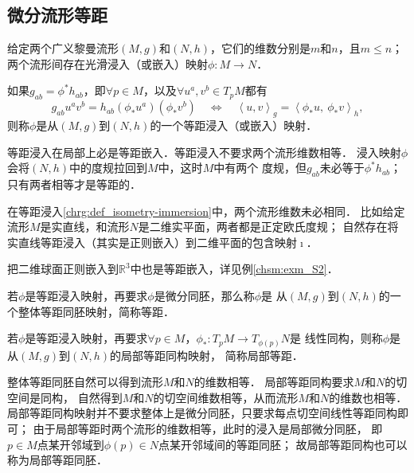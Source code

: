 \subsection{微分流形等距}
给定两个广义黎曼流形$(M,g)$和$(N,h)$，它们的维数分别是$m$和$n$，且$m \leqslant n$；
两个流形间存在光滑浸入（或嵌入）映射$\phi:M\to N$．
\begin{definition}\label{chrg:def_isometry-immersion}
    如果$g_{ab}=\phi^{*}h_{ab}$，即$\forall p \in M$，以及$\forall u^a,v^b \in T_{p}M$都有
    \begin{equation}
        g_{ab} u^a v^b = h_{ab} (\phi_{*} u^a) (\phi_{*} v^b) 
        \quad \Leftrightarrow \quad
        \left<u,v\right>_g = \left<\phi_{*}u,\  \phi_{*}v\right>_h,
    \end{equation}
    则称$\phi$是从$(M,g)$到$(N,h)$的一个{\heiti 等距浸入}（或嵌入）映射．
\end{definition}
等距浸入在局部上必是等距嵌入．等距浸入不要求两个流形维数相等．
浸入映射$\phi$会将$(N,h)$中的度规拉回到$M$中，这时$M$中有两个
度规，但$g_{ab}$未必等于$\phi^{*}h_{ab}$；只有两者相等才是等距的．

\begin{example}
    在等距浸入\ref{chrg:def_isometry-immersion}中，两个流形维数未必相同．
    比如给定流形$M$是实直线，和流形$N$是二维实平面，两者都是正定欧氏度规；
    自然存在将实直线等距浸入（其实是正则嵌入）到二维平面的包含映射$\imath$．
\end{example}
\begin{example}
    把二维球面正则嵌入到$\mathbb{R}^3$中也是等距嵌入，详见例\ref{chsm:exm_S2}．
\end{example}


\begin{definition}\label{chrg:def_isometry-diffeomorphism}
    若$\phi$是等距浸入映射，再要求$\phi$是微分同胚，那么称$\phi$是
    从$(M,g)$到$(N,h)$的一个{\heiti 整体等距同胚}映射，简称{\heiti 等距}．
\end{definition}


\begin{definition}\label{chrg:def_isometry-local-isomorphism}
    若$\phi$是等距浸入映射，再要求$\forall p\in M$，$\phi_{*}:T_{p}M \to T_{\phi(p)}N$是
    线性同构，则称$\phi$是从$(M,g)$到$(N,h)$的{\heiti 局部等距同构}映射，
    简称{\heiti 局部等距}．
\end{definition}
整体等距{\kaishu 同胚}自然可以得到流形$M$和$N$的维数相等．
局部等距{\kaishu 同构}要求$M$和$N$的切空间是同构，
自然得到$M$和$N$的切空间维数相等，从而流形$M$和$N$的维数也相等．
局部等距同构映射并不要求整体上是微分同胚，只要求每点切空间线性等距同构即可；
由于局部等距时两个流形的维数相等，此时的浸入是局部微分同胚，
即$p\in M$点某开邻域到$\phi(p)\in N$点某开邻域间的等距同胚；
故局部等距同构也可以称为{\heiti 局部等距同胚}．

